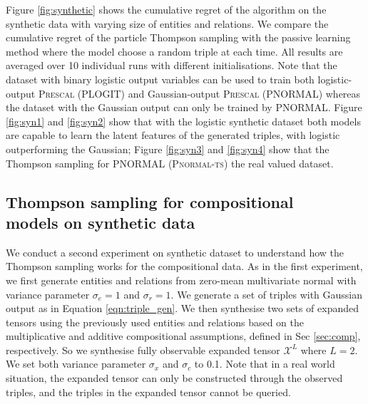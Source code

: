 {Figure \ref{fig:synthetic} shows the cumulative regret of the algorithm on the synthetic data with varying size of
entities and relations. We compare the cumulative regret of the particle Thompson sampling with the passive
learning method where the model choose a random triple at each time. All results are averaged over 10
individual runs with different initialisations.
Note that the dataset with binary logistic output variables can be used to train both logistic-output \textsc{Prescal} (PLOGIT) and Gaussian-output \textsc{Prescal} (PNORMAL) whereas the dataset with the Gaussian output can only be trained by PNORMAL.
Figure \ref{fig:syn1} and \ref{fig:syn2} show that with the logistic synthetic dataset both models are capable to learn the latent features of the generated triples, with logistic outperforming the Gaussian; Figure \ref{fig:syn3} and \ref{fig:syn4} show that the Thompson sampling for PNORMAL (\textsc{Pnormal-ts})  the real valued dataset.

\subsection{Thompson sampling for compositional\\ models on synthetic data}

We conduct a second experiment on synthetic dataset to understand how
the Thompson sampling works for the compositional data.
As in the first experiment, we first generate entities and relations from
zero-mean multivariate normal with variance parameter $\sigma_e = 1$ and
$\sigma_r=1$. We generate a set of triples with Gaussian output as in
Equation \ref{eqn:triple_gen}. We then synthesise two sets of expanded tensors
using the previously used entities and relations based on the multiplicative
and additive compositional assumptions, defined in Sec \ref{sec:comp},
respectively. So we synthesise fully observable expanded tensor $\mathcal{X}^L$
where $L=2$. We set both variance parameter $\sigma_x$ and $\sigma_c$ to 0.1.
Note that in a real world situation, the expanded tensor can only be constructed
through the observed triples, and the triples in the expanded tensor cannot be queried.

}
